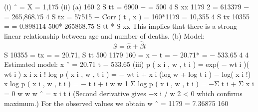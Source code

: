 \documentclass[a4paper,12pt]{article}
\begin{document}
(i) \mu ˆ = X = 1,175
(ii)
(a)
160 2
S tt = 6900 −
= 500
4
S xx
1179 2
= 613379 −
= 265,868.75
4
S tx = 57515 −
Corr ( t , x ) =
160*1179
= 10,355
4
S tx
10355
=
= 0.898114
500* 265868.75
S tt * S xx
This implies that there is a strong linear relationship between age and number of deaths.
(b)
Model: \[x̂ = \hat{\alpha} + \hat{\beta} t\]
S
10355
\hat{\beta} = tx =
= 20.71,
S tt
500
1179
160
\hat{\alpha} = x − \hat{\beta} t =
− 20.71*
= − 533.65
4
4
Estimated model: x ˆ = 20.71 t − 533.65
(iii)
p ( x i , w , t i ) =
exp( − wt i )( wt i ) x i
x i !
log p ( x i , w , t i ) = − wt i + x i (log w + log t i ) − log( x i !)
x
\frac{\partial}{\partial}
log p ( x i , w , t i ) = − t i + i
w
\frac{\partial}{\partial} w
\frac{\partial}{\partial}
1
Σ
log p ( x i , w , t i ) = −Σ t i + Σ x i = 0
w
\frac{\partial}{\partial} w
w ˆ =
\sum x i
\sum  t i
(Second derivative gives −\sum x i / w 2 < 0 which confirms maximum.)
For the observed values we obtain w ˆ =
1179
= 7.36875
160
\end{document}
